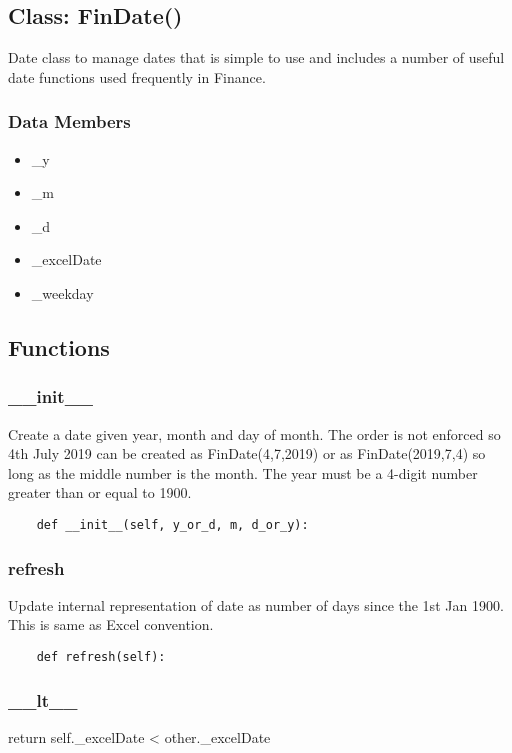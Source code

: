 \documentclass[twoside,11pt]{book}
\begin{document}
\subsection*{Class: FinDate()}
Date class to manage dates that is simple to use and includes a number of useful date functions used frequently in Finance.  

\subsubsection*{Data Members}
\begin{itemize}
\item{\_y}
\item{\_m}
\item{\_d}
\item{\_excelDate}
\item{\_weekday}
\end{itemize}

\subsection*{Functions}

\subsubsection*{{\bf \_\_init\_\_}}
Create a date given year, month and day of month. The order is not enforced so 4th July 2019 can be created as FinDate(4,7,2019) or as FinDate(2019,7,4) so long as the middle number is the month. The year must be a 4-digit number greater than or equal to 1900.  

\begin{lstlisting}
    def __init__(self, y_or_d, m, d_or_y):
\end{lstlisting}

\subsubsection*{{\bf refresh}}
Update internal representation of date as number of days since the 1st Jan 1900. This is same as Excel convention.  

\begin{lstlisting}
    def refresh(self):
\end{lstlisting}

\subsubsection*{{\bf \_\_lt\_\_}}
return self.\_excelDate < other.\_excelDate 
\end{document}
